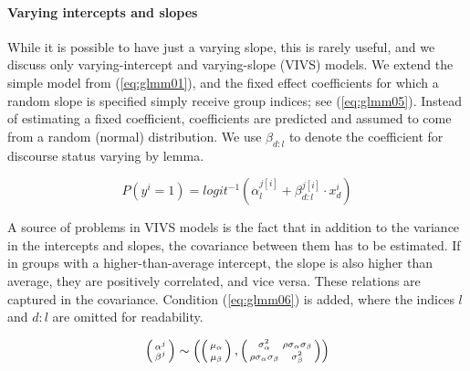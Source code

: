 \documentclass[a4paper,12pt]{article}
\begin{document}

\paragraph{Varying intercepts and slopes}

While it is possible to have just a varying slope, this is rarely useful, and we discuss only varying-intercept and varying-slope (VIVS) models.
We extend the simple model from (\ref{eq:glmm01}), and the fixed effect coefficients for which a random slope is specified simply receive group indices; see (\ref{eq:glmm05}).
Instead of estimating a fixed coefficient, coefficients are predicted and assumed to come from a random (normal) distribution.
We use $\beta_{d:l}$ to denote the coefficient for discourse status varying by lemma.

\begin{equation}
  P(y^i=1)=logit^{-1}(\alpha_{l}^{j[i]}+\beta_{d:l}^{j[i]}\cdot x_d^i)
  \label{eq:glmm05}
\end{equation}

A source of problems in VIVS models is the fact that in addition to the variance in the intercepts and slopes, the covariance between them has to be estimated.
If in groups with a higher-than-average intercept, the slope is also higher than average, they are positively correlated, and vice versa.
These relations are captured in the covariance.
Condition (\ref{eq:glmm06}) is added, where the indices $l$ and $d:l$ are omitted for readability.

\begin{equation} 
  \left( \begin{smallmatrix} \alpha^j \\ \beta^j \end{smallmatrix}\right) \sim
    \left(
    \left( \begin{smallmatrix} \mu_{\alpha}\vphantom{\beta^j} \\ \mu_{\beta}\vphantom{\beta^j} \end{smallmatrix} \right), 
      \left( \begin{smallmatrix} \sigma_{\alpha}^2 & \rho\sigma_{\alpha}\sigma_{\beta} \\
	\rho\sigma_{\alpha}\sigma_{\beta} & \sigma_{\beta}^2 \end{smallmatrix} \right)
    \right)
  \label{eq:glmm06}
\end{equation}
\end{document}
